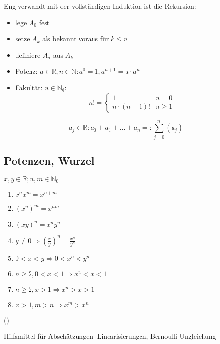 Eng verwandt mit der vollständigen Induktion ist die Rekursion:
\begin{itemize}
 \item lege $A_0$ fest
 \item setze $A_k$ als bekannt voraus für $k \leq n$
 \item definiere $A_n$ aus $A_k$
\end{itemize}

\begin{example}[Standard]
  \begin{itemize}
    \item Potenz: $a \in \mathbb{R}, n \in \mathbb{N}: a^0 = 1, a^{n+1} = a\cdot a^n$
    \item Fakultät: $n \in \mathbb{N}_0:$
    \begin{equation*} n! = \begin{cases} 1 & n = 0 \\ n \cdot (n-1)! & n \geq 1 \end{cases} \end{equation*}
  \end{itemize}
\end{example}

\begin{definition}[Summensymbol]
  \begin{equation*} a_j \in \mathbb{R}: a_0 + a_1 + \ldots + a_n =: \sum_{j=0}^{n} \left( a_j \right) \end{equation*}
\end{definition}

\subsection{Potenzen, Wurzel}

\begin{theorem}\flush
  $x,y \in \mathbb{R}; n,m \in \mathbb{N}_0$
  \begin{enumerate}
   \item $x^nx^m = x^{n+m}$
   \item $(x^n)^m = x^{nm}$
   \item $(xy)^n = x^ny^n$
   \item $y \neq 0 \Rightarrow \left(\frac x y\right)^n = \frac{x^n}{y^n}$
   \item $0 < x < y \Rightarrow 0 < x^n < y^n$
   \item $n \geq 2, 0<x<1 \Rightarrow x^n<x<1$
   \item $n \geq 2, x > 1 \Rightarrow x^n>x>1$
   \item $x > 1, m > n \Rightarrow x^m > x^n$
  \end{enumerate}
  (\induction)
\end{theorem}
%
\noindent Hilfsmittel für Abschätzungen: Linearisierungen, Bernoulli-Ungleichung

